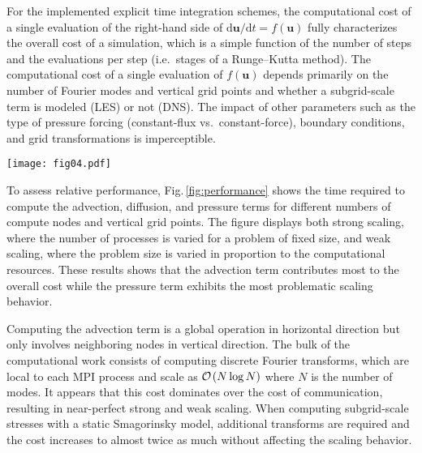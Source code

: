 \documentclass[gmd, manuscript]{copernicus}
\begin{document}
For the implemented explicit time integration schemes, the computational cost of a single evaluation of the right-hand side of \(\mathrm{d}\boldsymbol{u}/\mathrm{d}t=f(\boldsymbol{u})\) fully characterizes the overall cost of a simulation, which is a simple function of the number of steps and the evaluations per step (i.e.~stages of a Runge--Kutta method).
The computational cost of a single evaluation of \(f(\boldsymbol{u})\) depends primarily on the number of Fourier modes and vertical grid points and whether a subgrid-scale term is modeled (LES) or not (DNS).
The impact of other parameters such as the type of pressure forcing (constant-flux vs.~constant-force), boundary conditions, and grid transformations is imperceptible.

\begin{figure*}[!t]%
  \centering
  \texttt{[image: fig04.pdf]}
  \caption{Performance and scaling of individual terms and full time step, as measured on Intel Xeon Ice Lake nodes of the Stampede2 system at the Texas Advanced Computing Center. Individual terms are computed at a resolution of $256 \times 256 \times \lambda N_\mathrm{p}$, where $\lambda \in \{1,2,4,8,16\}$ is the number of vertical grid points per MPI process and $N_\mathrm{p}$ is the total number of MPI processes. Dotted lines indicate weak scaling, dashed lines indicate strong scaling, and the grid lines correspond to perfect scaling. The last panel shows the overall performance for the resolution $256 \times 256 \times 1280$ (highlighted in orange on other panels) in comparison to a pre-existing Fortran implementation of the same numerical approach \citep{Giometto+2017a}. DNS performance is shown with the symbol $+$, LES performance with the symbol $\times$.}\label{fig:performance}
\end{figure*}

To assess relative performance, Fig.\,\ref{fig:performance} shows the time required to compute the advection, diffusion, and pressure terms for different numbers of compute nodes and vertical grid points.
The figure displays both strong scaling, where the number of processes is varied for a problem of fixed size, and weak scaling, where the problem size is varied in proportion to the computational resources.
These results shows that the advection term contributes most to the overall cost while the pressure term exhibits the most problematic scaling behavior.

Computing the advection term is a global operation in horizontal direction but only involves neighboring nodes in vertical direction.
The bulk of the computational work consists of computing discrete Fourier transforms, which are local to each MPI process and scale as \(\mathcal{O} \mkern -1mu \left( N \log N \right)\) where \(N\) is the number of modes.
It appears that this cost dominates over the cost of communication, resulting in near-perfect strong and weak scaling.
When computing subgrid-scale stresses with a static Smagorinsky model, additional transforms are required and the cost increases to almost twice as much without affecting the scaling behavior.
\end{document}
